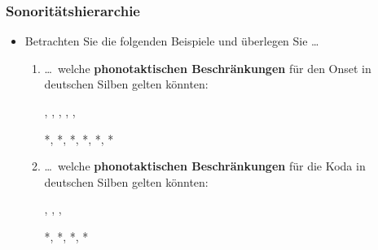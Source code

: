 \begin{frame}
\frametitle{Sonoritätshierarchie}

\begin{itemize}
	\item Betrachten Sie die folgenden Beispiele und überlegen Sie \dots
	
	\begin{enumerate}
		\item \dots\ welche \textbf{phonotaktischen Beschränkungen} für den Onset in deutschen Silben gelten könnten:

                  \ea
                  , , ,
                  , , 
                  \z

                  \ea
                  *, *, *, *, *, *
                  \z
                  
\pause
		\item \dots\ welche \textbf{phonotaktischen Beschränkungen} für die Koda in deutschen Silben gelten könnten:

                  \ea
                  , , , 
                  \z

                  \ea
                  *\textipa{[ka{tl}]}, *\textipa{[ha{t\textscr}]}, *,
                  *
                  \z

	\end{enumerate}
	
\end{itemize}

\end{frame}




